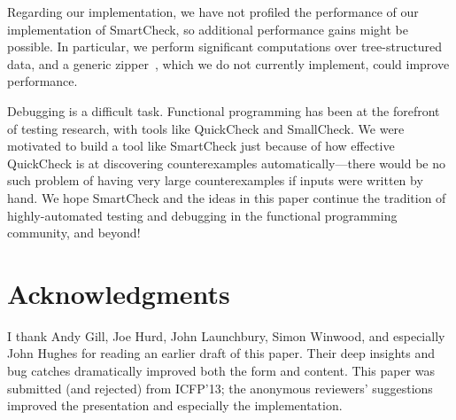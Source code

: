 \documentclass{sigplanconf}
\begin{document}
Regarding our implementation, we have not profiled the performance of our
implementation of SmartCheck, so additional performance gains might be possible.
In particular, we perform significant computations over tree-structured data,
and a generic zipper~\cite{zipper}, which we do not currently implement, could
improve performance.

Debugging is a difficult task.  Functional programming has been at the forefront
of testing research, with tools like QuickCheck and SmallCheck.  We were
motivated to build a tool like SmartCheck just because of how effective
QuickCheck is at discovering counterexamples automatically---there would be no
such problem of having very large counterexamples if inputs were written by
hand.  We hope SmartCheck and the ideas in this paper continue the tradition of
highly-automated testing and debugging in the functional programming community,
and beyond!



\section*{Acknowledgments}
I thank Andy Gill, Joe Hurd, John Launchbury, Simon Winwood, and especially John
Hughes for reading an earlier draft of this paper.  Their deep insights and bug
catches dramatically improved both the form and content.  This paper was
submitted (and rejected) from ICFP'13; the anonymous reviewers' suggestions
improved the presentation and especially the implementation.




\balancecolumns
\end{document}

